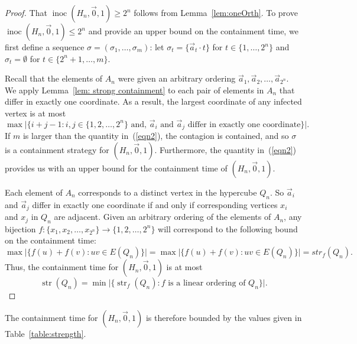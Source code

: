 \documentclass[unknownkeysallowed]{article}
\theoremstyle{definition}\newtheorem{strategy}{Strategy}
\theoremstyle{definition}\newtheorem{notation}{Notation}[theorem]
\DeclareMathOperator{\strength}{str}
\DeclareMathOperator{\inoc}{inoc}
\begin{document}
\begin{proof} 
That $\inoc(H_n,\vec{0},1) \geq 2^n$ follows from Lemma~\ref{lem:oneOrth}.  To prove $\inoc(H_n,\vec{0},1) \leq 2^n$ and provide an upper bound on the containment time, we first define a sequence $\sigma = (\sigma_1,\dots,\sigma_m)$:  let $\sigma_t = \{\vec{a}_t \cdot t\}$ for $t \in \{1,\dots,2^n\}$ and $\sigma_t = \emptyset$ for $t \in \{2^n+1,\dots,m\}$.

Recall that the elements of $A_n$ were given an arbitrary ordering $\vec{a}_1,\vec{a}_2,\dots,\vec{a}_{2^n}$.  We apply Lemma~\ref{lem: strong containment} to each pair of elements in $A_n$ that differ in exactly one coordinate.  As a result,  the largest coordinate of any infected vertex is at most \begin{equation}\label{eqn2}\max \big|\{i+j-1 : i,j \in \{1,2,\dots,2^n\} \text{~and, $\vec{a}_i$ and $\vec{a}_j$ differ in exactly one coordinate}\}\big|.\end{equation}  If $m$ is larger than the quantity in~(\ref{eqn2}), the contagion is contained, and so  $\sigma$ is a containment strategy for $(H_n,\vec{0},1)$. Furthermore, the quantity in~(\ref{eqn2}) provides us with an upper bound for the containment time of $(H_n,\vec{0},1)$. 

Each element of $A_n$ corresponds to a distinct vertex in the hypercube $Q_n$.  So $\vec{a}_i$ and $\vec{a}_j$ differ in exactly one coordinate if and only if corresponding vertices $x_i$ and $x_j$ in $Q_n$ are adjacent.  Given an arbitrary ordering of the elements of $A_n$, any bijection $f : \{x_1,x_2,\dots,x_{2^n}\} \rightarrow \{1,2,\dots,2^n\}$ will correspond to the following bound on the containment time: $$\max \big| \{f(u)+f(v): uv \in E(Q_n)\}\big| = \max \big| \{f(u)+f(v) : uv \in E(Q_n)\}\big| = str_f(Q_n).$$  Thus, the containment time for $(H_n,\vec{0},1)$ is at most $$\strength(Q_n) = \min \big| \{\strength_f(Q_n) : f \text{~is a linear ordering of~} Q_n\}\big|.$$

\end{proof}


The containment time for $(H_n,\vec{0},1)$ is therefore bounded by the values given in Table~\ref{table:strength}.
\end{document}
